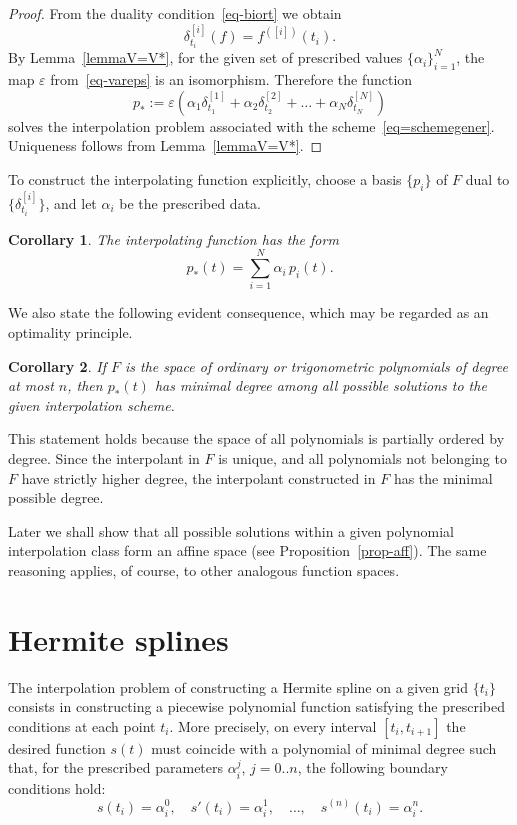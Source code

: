 \documentclass{article}
\newtheorem{corollary}{Corollary}[theorem]
\theoremstyle{definition}
\theoremstyle{definition}
\numberwithin{figure}{section}
\newcommand{\1}{\mathbf{1}}
\begin{document}
\begin{proof}
    From the duality condition~\eqref{eq-biort} we obtain
    \[
        \delta^{[i]}_{t_i}(f) = f^{([i])}(t_i).
    \]
    By Lemma~\ref{lemmaV=V*}, for the given set of prescribed values $\{\alpha_i\}_{i=1}^N$, the map $\varepsilon$ from~\eqref{eq-vareps} is an isomorphism. Therefore the function
    \[
        p_* := \varepsilon\!\left(\alpha_1 \delta^{[1]}_{t_1}
        + \alpha_2 \delta^{[2]}_{t_2}
        + \dots
        + \alpha_N \delta^{[N]}_{t_N}
        \right)
    \]
    solves the interpolation problem associated with the scheme~\eqref{eq=schemegener}.  
    Uniqueness follows from Lemma~\ref{lemmaV=V*}.
\end{proof}

To construct the interpolating function explicitly, choose a basis $\{p_i\}$ of $F$ dual to $\{\delta^{[i]}_{t_i}\}$, and let $\alpha_i$ be the prescribed data.

\begin{corollary}
    The interpolating function has the form
    \[
        p_*(t) = \sum_{i=1}^N \alpha_i\, p_i(t).
    \]
\end{corollary}

We also state the following evident consequence, which may be regarded as an optimality principle.

\begin{corollary}
    If $F$ is the space of ordinary or trigonometric polynomials of degree at most $n$, then $p_*(t)$ has minimal degree among all possible solutions to the given interpolation scheme.
\end{corollary}

This statement holds because the space of all polynomials is partially ordered by degree. Since the interpolant in $F$ is unique, and all polynomials not belonging to $F$ have strictly higher degree, the interpolant constructed in $F$ has the minimal possible degree.

Later we shall show that all possible solutions within a given polynomial interpolation class form an affine space (see Proposition~\ref{prop-aff}). The same reasoning applies, of course, to other analogous function spaces.

\section{Hermite splines}\label{sec-splines}

The interpolation problem of constructing a Hermite spline on a given grid $\{t_i\}$ consists in constructing a piecewise polynomial function satisfying the prescribed conditions at each point $t_i$. More precisely, on every interval $[t_i, t_{i+1}]$ the desired function $s(t)$ must coincide with a polynomial of minimal degree such that, for the prescribed parameters $\alpha_i^j$, $j = 0..n$, the following boundary conditions hold:
\[
    s(t_i) = \alpha^0_i,\quad 
    s'(t_i) = \alpha^1_i,\quad 
    \dots,\quad 
    s^{(n)}(t_i) = \alpha^n_i.
\]
\end{document}
